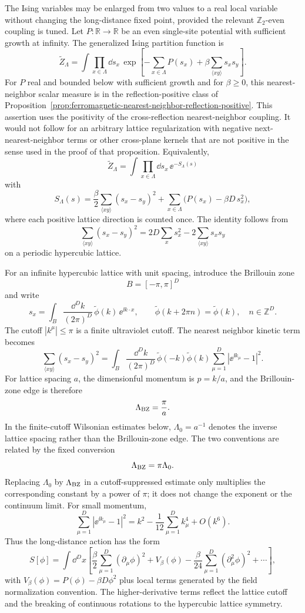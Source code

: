 The Ising variables may be enlarged from two values to a real local variable
without changing the long-distance fixed point, provided the relevant
\(\mathbb Z_2\)-even coupling is tuned.  Let \(P:\mathbb R\to\mathbb R\) be an
even single-site potential with sufficient growth at infinity.  The generalized
Ising partition function is
\[
  \widetilde Z_\Lambda
  =
  \int\prod_{x\in\Lambda}\dd s_x\,
  \exp\!\left[
    -\sum_{x\in\Lambda}P(s_x)
    +
    \beta\sum_{\langle x y\rangle}s_xs_y
  \right].
\]
For \(P\) real and bounded below with sufficient growth and for
\(\beta\geq0\), this nearest-neighbor scalar measure is in the
reflection-positive class of
Proposition~\ref{prop:ferromagnetic-nearest-neighbor-reflection-positive}.
This assertion uses the positivity of the cross-reflection nearest-neighbor
coupling.  It would not follow for an arbitrary lattice regularization with
negative next-nearest-neighbor terms or other cross-plane kernels that are not
positive in the sense used in the proof of that proposition.
Equivalently,
\[
  \widetilde Z_\Lambda
  =
  \int\prod_{x\in\Lambda}\dd s_x\,\ee^{-S_\Lambda(s)}
\]
with
\[
  S_\Lambda(s)
  =
  \frac{\beta}{2}\sum_{\langle x y\rangle}(s_x-s_y)^2
  +
  \sum_{x\in\Lambda}\bigl(P(s_x)-\beta D\,s_x^2\bigr),
\]
where each positive lattice direction is counted once.  The identity follows
from
\[
  \sum_{\langle x y\rangle}(s_x-s_y)^2
  =
  2D\sum_xs_x^2-2\sum_{\langle x y\rangle}s_xs_y
\]
on a periodic hypercubic lattice.

For an infinite hypercubic lattice with unit spacing, introduce the Brillouin
zone
\[
  B=[-\pi,\pi]^D
\]
and write
\[
  s_x
  =
  \int_B\frac{\dd^Dk}{(2\pi)^D}\,
  \widetilde\phi(k)\,\ee^{\ii k\cdot x},
  \qquad
  \widetilde\phi(k+2\pi n)=\widetilde\phi(k),
  \quad n\in\mathbb Z^D .
\]
The cutoff \(|k^\mu|\leq\pi\) is a finite ultraviolet cutoff.  The nearest
neighbor kinetic term becomes
\[
  \sum_{\langle x y\rangle}(s_x-s_y)^2
  =
  \int_B\frac{\dd^Dk}{(2\pi)^D}\,
  \widetilde\phi(-k)\widetilde\phi(k)
  \sum_{\mu=1}^D\left|\ee^{\ii k_\mu}-1\right|^2 .
\]
For lattice spacing \(a\), the dimensionful momentum is \(p=k/a\), and the
Brillouin-zone edge is therefore
\[
  \Lambda_{\rm BZ}=\frac{\pi}{a}.
\]
In the finite-cutoff Wilsonian estimates below, \(\Lambda_0=a^{-1}\) denotes
the inverse lattice spacing rather than the Brillouin-zone edge.  The two
conventions are related by the fixed conversion
\[
  \Lambda_{\rm BZ}=\pi\Lambda_0 .
\]
Replacing \(\Lambda_0\) by \(\Lambda_{\rm BZ}\) in a cutoff-suppressed estimate
only multiplies the corresponding constant by a power of \(\pi\); it does not
change the exponent or the continuum limit.
For small momentum,
\[
  \sum_{\mu=1}^D\left|\ee^{\ii k_\mu}-1\right|^2
  =
  k^2-\frac1{12}\sum_{\mu=1}^D k_\mu^4+O(k^6).
\]
Thus the long-distance action has the form
\[
  S[\phi]
  =
  \int \dd^Dx
  \left[
    \frac{\beta}{2}\sum_{\mu=1}^D(\partial_\mu\phi)^2
    +
    V_\beta(\phi)
    -
    \frac{\beta}{24}\sum_{\mu=1}^D(\partial_\mu^2\phi)^2
    +\cdots
  \right],
\]
with \(V_\beta(\phi)=P(\phi)-\beta D\phi^2\) plus local terms generated by the
field normalization convention.  The higher-derivative terms reflect the
lattice cutoff and the breaking of continuous rotations to the hypercubic
lattice symmetry.

